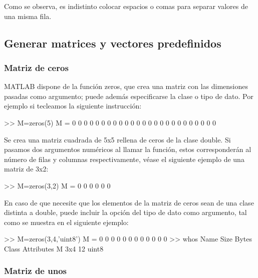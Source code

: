 Como se observa, es indistinto colocar espacios o comas para separar
valores de una misma fila.

\subsection{Generar matrices y vectores predefinidos}\label{generar-matrices-y-vectores-predefinidos}

\subsubsection{Matriz de ceros}\label{matriz-de-ceros}

MATLAB dispone de la función zeros, que crea una matriz con las
dimensiones pasadas como argumento; puede además especificarse la clase
o tipo de dato. Por ejemplo si tecleamos la siguiente instrucción:

\begin{matlab}
>> M=zeros(5)
M =
     0     0     0     0     0
     0     0     0     0     0
     0     0     0     0     0
     0     0     0     0     0
     0     0     0     0     0
\end{matlab}

Se crea una matriz cuadrada de 5x5 rellena de ceros de la clase double.
Si pasamos dos argumentos numéricos al llamar la función, estos
corresponderán al número de filas y columnas respectivamente, véase el
siguiente ejemplo de una matriz de 3x2:

\begin{matlab}
>> M=zeros(3,2)
M =
     0     0
     0     0
     0     0
\end{matlab}

En caso de que necesite que los elementos de la matriz de ceros sean de
una clase distinta a double, puede incluir la opción del tipo de dato
como argumento, tal como se muestra en el siguiente ejemplo:

\begin{matlab}
>> M=zeros(3,4,'uint8')
M =
    0    0    0    0
    0    0    0    0
    0    0    0    0
>> whos
  Name      Size            Bytes  Class    Attributes
  M         3x4                12  uint8              
\end{matlab}

\subsubsection{Matriz de unos}\label{matriz-de-unos}

